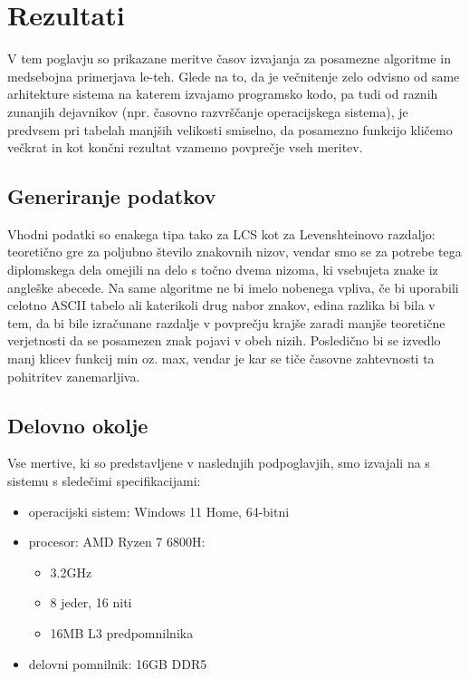 \documentclass[a4paper,12pt,openright]{book}
\begin{document}
\chapter{Rezultati}

V tem poglavju so prikazane meritve časov izvajanja za posamezne algoritme in medsebojna primerjava le-teh. Glede na to, da je večnitenje zelo odvisno od same arhitekture sistema na katerem izvajamo programsko kodo, pa tudi od raznih zunanjih dejavnikov (npr. časovno razvrščanje operacijskega sistema), je predvsem pri tabelah manjših velikosti smiselno, da posamezno funkcijo kličemo večkrat in kot končni rezultat vzamemo povprečje vseh meritev. 

\section{Generiranje podatkov}

Vhodni podatki so enakega tipa tako za LCS kot za Levenshteinovo razdaljo: teoretično gre za poljubno število znakovnih nizov, vendar smo se za potrebe tega diplomskega dela omejili na delo s točno dvema nizoma, ki vsebujeta znake iz angleške abecede. Na same algoritme ne bi imelo nobenega vpliva, če bi uporabili celotno ASCII tabelo ali katerikoli drug nabor znakov, edina razlika bi bila v tem, da bi bile izračunane razdalje v povprečju krajše zaradi manjše teoretične verjetnosti da se posamezen znak pojavi v obeh nizih. Posledično bi se izvedlo manj klicev funkcij min oz. max, vendar je kar se tiče časovne zahtevnosti ta pohitritev zanemarljiva. 

\section{Delovno okolje}

Vse mertive, ki so predstavljene v naslednjih podpoglavjih, smo izvajali na s sistemu s sledečimi specifikacijami:
\begin{itemize}
    \item operacijski sistem: Windows 11 Home, 64-bitni
    \item procesor: AMD Ryzen 7 6800H:
        \begin{itemize}
            \item 3.2GHz
            \item 8 jeder, 16 niti
            \item 16MB L3 predpomnilnika
        \end{itemize}
    \item delovni pomnilnik: 16GB DDR5
\end{itemize}
\end{document}
